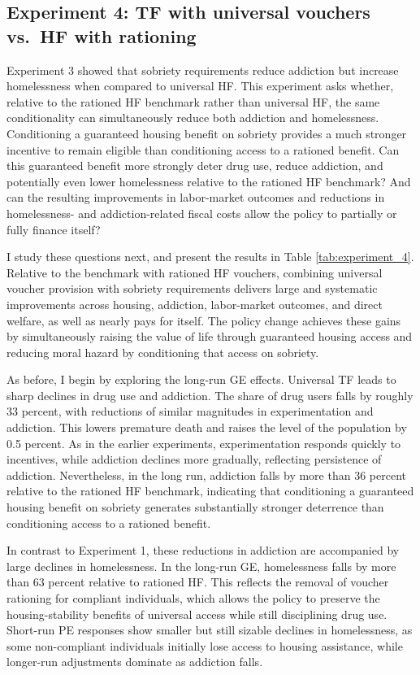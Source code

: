 \documentclass[parskip=full]{article}
\theoremstyle{plain}
\theoremstyle{definition}
\theoremstyle{remark}
\begin{document}
\subsection{Experiment 4: TF with universal vouchers vs.\ HF with rationing}

Experiment 3 showed that sobriety requirements reduce addiction but increase homelessness when compared to universal HF. This experiment asks whether, relative to the rationed HF benchmark rather than universal HF, the same conditionality can simultaneously reduce both addiction and homelessness. Conditioning a guaranteed housing benefit on sobriety provides a much stronger incentive to remain eligible than conditioning access to a rationed benefit. Can this guaranteed benefit more strongly deter drug use, reduce addiction, and potentially even lower homelessness relative to the rationed HF benchmark? And can the resulting improvements in labor-market outcomes and reductions in homelessness- and addiction-related fiscal costs allow the policy to partially or fully finance itself?

I study these questions next, and present the results in Table \ref{tab:experiment_4}. Relative to the benchmark with rationed HF vouchers, combining universal voucher provision with sobriety requirements delivers large and systematic improvements across housing, addiction, labor-market outcomes, and direct welfare, as well as nearly pays for itself. The policy change achieves these gains by simultaneously raising the value of life through guaranteed housing access and reducing moral hazard by conditioning that access on sobriety.

As before, I begin by exploring the long-run GE effects. Universal TF leads to sharp declines in drug use and addiction. The share of drug users falls by roughly 33 percent, with reductions of similar magnitudes in experimentation and addiction. This lowers premature death and raises the level of the population by 0.5 percent. As in the earlier experiments, experimentation responds quickly to incentives, while addiction declines more gradually, reflecting persistence of addiction. Nevertheless, in the long run, addiction falls by more than 36 percent relative to the rationed HF benchmark, indicating that conditioning a guaranteed housing benefit on sobriety generates substantially stronger deterrence than conditioning access to a rationed benefit.

In contrast to Experiment 1, these reductions in addiction are accompanied by large declines in homelessness. In the long-run GE, homelessness falls by more than 63 percent relative to rationed HF. This reflects the removal of voucher rationing for compliant individuals, which allows the policy to preserve the housing-stability benefits of universal access while still disciplining drug use. Short-run PE responses show smaller but still sizable declines in homelessness, as some non-compliant individuals initially lose access to housing assistance, while longer-run adjustments dominate as addiction falls.
\end{document}
